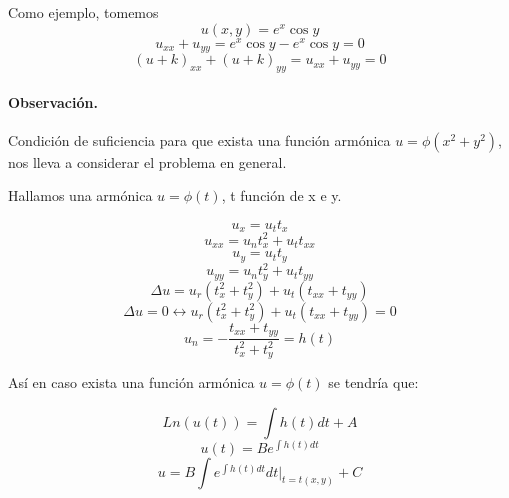 \documentclass[a4paper,12pt]{article}
\begin{document}
Como ejemplo, tomemos $$u(x, y) = e^x \cos y$$
$$u_{xx} + u_{yy} = e^x \cos y - e^x \cos y = 0$$
$$(u + k)_{xx} + (u + k)_{yy} = u_{xx} + u_{yy} = 0$$

\paragraph{Observación.}

Condición de suficiencia para que exista una función armónica $u = \phi(x^2 + y^2)$, nos lleva a considerar el problema en general.

Hallamos una armónica $u = \phi(t)$, t función de x e y.

$$u_x = u_t t_x$$
$$u_{xx} = u_n t_x^2 + u_t t_{xx}$$
$$u_y = u_t t_y$$
$$u_{yy} = u_n t_y^2 + u_t t_{yy}$$
$$\Delta u = u_r \left( t_x^2 + t_y^2 \right) + u_t \left( t_{xx} + t_{yy} \right)$$
$$\Delta u = 0 \leftrightarrow u_r \left( t_x^2 + t_y^2 \right) + u_t \left( t_{xx} + t_{yy} \right) = 0$$
$$u_n = -\frac{t_{xx} + t_{yy}}{t_x^2 + t_y^2} = h(t)$$

Así en caso exista una función armónica $u = \phi(t)$ se tendría que:

$$Ln(u(t)) = \int h(t) dt + A$$
$$u(t) = Be^{\int h(t) dt}$$
$$u = B \int e^{\int h(t) dt} dt \bigg|_{t=t(x,y)} + C$$
\end{document}
